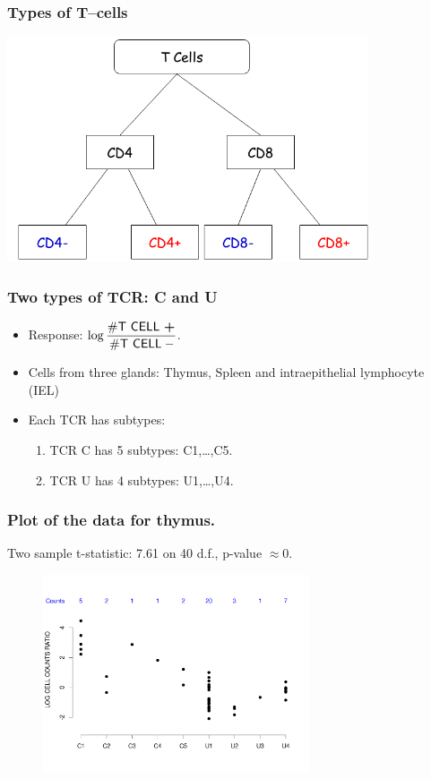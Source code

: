 \documentclass{beamer}
\begin{document}
\begin{frame}
\frametitle{Types of T--cells}
 \begin{center}
  \includegraphics[width=0.8\textwidth]{TCELLS}
 \end{center}
\end{frame}


\begin{frame}
 \frametitle{Two types of TCR: C and U}
 
 \begin{itemize}
  \item Response: $\log\dfrac{\# \textsf{T CELL \bf +}}{\#\textsf{T CELL \bf --}}$.
  \item Cells from three glands: \alert{Thymus}, \alert{Spleen} and intraepithelial lymphocyte (\alert{IEL})
  \item Each TCR has subtypes:
   \begin{enumerate}
    \item TCR \alert{C} has \alert{5} subtypes: C1,\ldots,C5.
    \item TCR \alert{U} has \alert{4} subtypes: U1,\ldots,U4.
   \end{enumerate}

 \end{itemize}
\end{frame}

\begin{frame}
\frametitle{Plot of the data for thymus.}
Two sample t-statistic: 7.61 on 40 d.f., p-value $\approx 0$.
\begin{figure}
\centering \includegraphics[width=0.7\textwidth]{plot_thymus}
\end{figure}
\end{frame}
\end{document}
